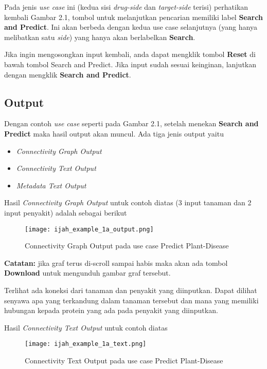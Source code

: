 Pada jenis \emph{use case} ini (kedua sisi \emph{drug-side} dan \emph{target-side} terisi) perhatikan kembali Gambar 2.1\label{fig:example_1a}, tombol untuk melanjutkan pencarian memiliki label \textbf{Search and Predict}. Ini akan berbeda dengan kedua use case selanjutnya (yang hanya melibatkan satu \emph{side}) yang hanya akan berlabelkan \textbf{Search}.

Jika ingin mengosongkan input kembali, anda dapat mengklik tombol \textbf{Reset} di bawah tombol Search and Predict. Jika input sudah sesuai keinginan, lanjutkan dengan mengklik \textbf{Search and Predict}.

\subsection{Output}
Dengan contoh \emph{use case} seperti pada Gambar 2.1\label{fig:example_1a}, setelah menekan \textbf{Search and Predict} maka hasil output akan muncul. Ada tiga jenis output yaitu 

\begin{itemize}
\item \emph{Connectivity Graph Output}
\item \emph{Connectivity Text Output}
\item \emph{Metadata Text Output}
\end{itemize}

Hasil \emph{Connectivity Graph Output} untuk contoh diatas (3 input tanaman dan 2 input penyakit) adalah sebagai berikut

\begin{figure}[H]
	\centering
	\texttt{[image: ijah\_example\_1a\_output.png]}
	\caption{Connectivity Graph Output pada use case Predict Plant-Disease}
	\label{fig:ijah_example_1a_output}
\end{figure}

\textbf{Catatan:} jika graf terus di-scroll sampai habis maka akan ada tombol \textbf{Download} untuk mengunduh gambar graf tersebut.

Terlihat ada koneksi dari tanaman dan penyakit yang diinputkan. Dapat dilihat senyawa apa yang terkandung dalam tanaman tersebut dan mana yang memiliki hubungan kepada protein yang ada pada penyakit yang diinputkan.

Hasil \emph{Connectivity Text Output} untuk contoh diatas

\begin{figure}[H]
	\centering
	\texttt{[image: ijah\_example\_1a\_text.png]}
	\caption{Connectivity Text Output pada use case Predict Plant-Disease}
	\label{fig:ijah_example_1a_text}
\end{figure}

